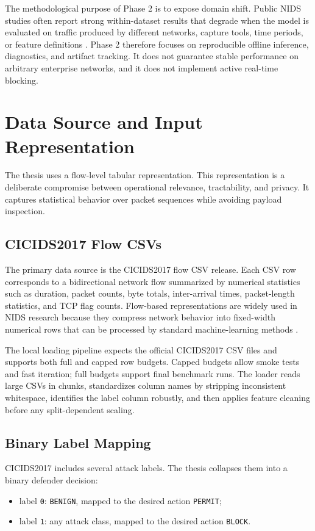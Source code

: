 The methodological purpose of Phase 2 is to expose domain shift. Public NIDS studies often report strong within-dataset results that degrade when the model is evaluated on traffic produced by different networks, capture tools, time periods, or feature definitions \parencite{Apruzzese2022CrossEvaluationNIDS,Layeghy2023CrossDomainNIDS}. Phase 2 therefore focuses on reproducible offline inference, diagnostics, and artifact tracking. It does not guarantee stable performance on arbitrary enterprise networks, and it does not implement active real-time blocking.

\section{Data Source and Input Representation}
The thesis uses a flow-level tabular representation. This representation is a deliberate compromise between operational relevance, tractability, and privacy. It captures statistical behavior over packet sequences while avoiding payload inspection.

\subsection{CICIDS2017 Flow CSVs}
The primary data source is the CICIDS2017 flow CSV release. Each CSV row corresponds to a bidirectional network flow summarized by numerical statistics such as duration, packet counts, byte totals, inter-arrival times, packet-length statistics, and TCP flag counts. Flow-based representations are widely used in NIDS research because they compress network behavior into fixed-width numerical rows that can be processed by standard machine-learning methods \parencite{Sperotto2010FlowIDS,Umer2017FlowIDS}.

The local loading pipeline expects the official CICIDS2017 CSV files and supports both full and capped row budgets. Capped budgets allow smoke tests and fast iteration; full budgets support final benchmark runs. The loader reads large CSVs in chunks, standardizes column names by stripping inconsistent whitespace, identifies the label column robustly, and then applies feature cleaning before any split-dependent scaling.

\subsection{Binary Label Mapping}
CICIDS2017 includes several attack labels. The thesis collapses them into a binary defender decision:
\begin{itemize}
    \item label \texttt{0}: \texttt{BENIGN}, mapped to the desired action \texttt{PERMIT};
    \item label \texttt{1}: any attack class, mapped to the desired action \texttt{BLOCK}.
\end{itemize}


